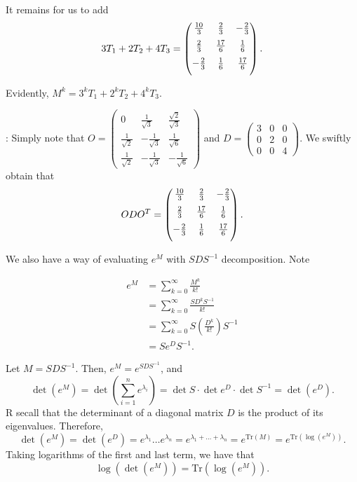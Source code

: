 \documentclass[a4paper, 12pt,oneside,openany]{book}
\begin{document}
It remains for us to add $$3T_1+2T_2+4T_3= \begin{pmatrix} \medskip \frac{10}{3} & \frac{2}{3}&-\frac{2}{3} \\ \medskip \frac{2}{3}&\frac{17}{6}&\frac{1}{6} \\ \medskip -\frac{2}{3}&\frac{1}{6}&\frac{17}{6}\end{pmatrix}.$$

Evidently, $M^k = 3^kT_1+2^kT_2+4^kT_3$.

: Simply note that $O = \begin{pmatrix} 0 & \frac{1}{\sqrt{3}} & \frac{\sqrt{2}}{\sqrt{3}} \\ \frac{1}{\sqrt{2}} & -\frac{1}{\sqrt{3}}&\frac{1}{\sqrt{6}} \\ \frac{1}{\sqrt{2}}&-\frac{1}{\sqrt{3}}&-\frac{1}{\sqrt{6}} \end{pmatrix}$ and $D=\begin{pmatrix} 3 & 0 &0 \\0&2&0\\0&0&4 \end{pmatrix}$. We swiftly obtain that $$ODO^T=\begin{pmatrix} \medskip \frac{10}{3} & \frac{2}{3}&-\frac{2}{3} \\ \medskip \frac{2}{3}&\frac{17}{6}&\frac{1}{6} \\ \medskip -\frac{2}{3}&\frac{1}{6}&\frac{17}{6}\end{pmatrix}.$$


We also have a way of evaluating $e^M$ with $SDS^{-1}$ decomposition. Note 

 \begin{align*} e^M &= \sum\limits_{k=0}^\infty \frac{M^k}{k!} \\ &= \sum\limits_{k=0}^\infty \frac{SD^kS^{-1}}{k!}\\ &= \sum\limits_{k=0}^\infty S \left( \frac{D^k}{k!} \right) S^{-1} \\ &= Se^DS^{-1}. \end{align*}
  
Let $M=SDS^{-1}$. Then, $e^M = e^{SDS^{-1}}$, and $$\det(e^M) = \det(\sum\limits_{i=1}^n e^{\lambda_i}) = \det{S} \cdot \det{e^D} \cdot \det{S^{-1}} = \det(e^D).$$ R secall that the determinant of a diagonal matrix $D$ is the product of its eigenvalues. Therefore, $$\det(e^M)=\det(e^D) = e^{\lambda_1}\dots e^{\lambda_n} = e^{\lambda_1+\dots+\lambda_n} = e^{\text{Tr}(M)}=e^{\text{Tr}(\log(e^M))}. $$ Taking logarithms of the first and last term, we have that $$\log(\det(e^M)) = \text{Tr}(\log(e^M)).$$
\end{document}

